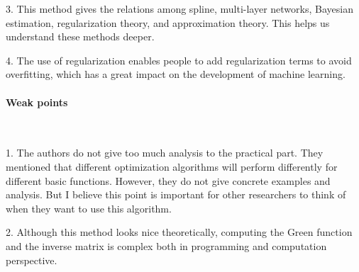 \documentclass{article}
\begin{document}
3. This method gives the relations among spline, multi-layer networks, Bayesian estimation, regularization theory, and approximation theory. This helps us understand these methods deeper.

4. The use of regularization enables people to add regularization terms to avoid overfitting, which has a great impact on the development of machine learning.

\paragraph{Weak points} \

1. The authors do not give too much analysis to the practical part. They mentioned that different optimization algorithms will perform differently for different basic functions. However, they do not give concrete examples and analysis. But I believe this point is important for other researchers to think of when they want to use this algorithm.

2. Although this method looks nice theoretically, computing the Green function and the inverse matrix is complex both in programming and computation perspective.

\newpage



\end{document}
